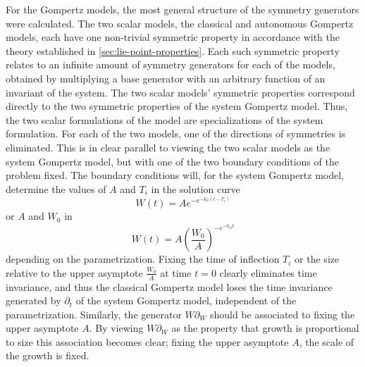 For the Gompertz models, the most general structure of the symmetry generators were calculated.
The two scalar models, the classical and autonomous Gompertz models, each have one non-trivial symmetric property in accordance with the theory established in \cref{sec:lie-point-properties}.
Each such symmetric property relates to an infinite amount of symmetry generators for each of the models, obtained by multiplying a base generator with an arbitrary function of an invariant of the system.
The two scalar models' symmetric properties correspond directly to the two symmetric properties of the system Gompertz model.
Thus, the two scalar formulations of the model are specializations of the system formulation. %
For each of the two models, one of the directions of symmetries is eliminated.
This is in clear parallel to viewing the two scalar models as the system Gompertz model, but with one of the two boundary conditions of the problem fixed.
The boundary conditions will, for the system Gompertz model, determine the values of \(A\) and \(T_i\) in the solution curve
\begin{equation*}
  W(t) = A e^{-e^{-k_G(t-T_i)}}
\end{equation*}
or \(A\) and \(W_0\) in
\begin{equation*}
  W(t) = A \left(\frac{W_0}{A}\right)^{-e^{-k_G t}}
\end{equation*}
depending on the parametrization.
Fixing the time of inflection \(T_i\) or the size relative to the upper asymptote \(\frac{W_0}{A}\) at time \(t = 0\) clearly eliminates time invariance, and thus the classical Gompertz model loses the time invariance generated by \(\partial_t\) of the system Gompertz model, independent of the parametrization.
Similarly, the generator \(W \partial_W\) should be associated to fixing the upper asymptote \(A\).
By viewing \(W \partial_W\) as the property that growth is proportional to size this association becomes clear; fixing the upper asymptote \(A\), the scale of the growth is fixed.

